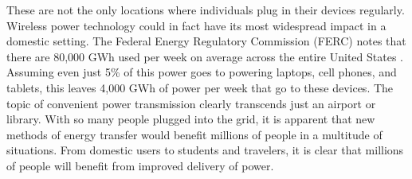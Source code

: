 These are not the only locations where individuals plug in their devices regularly. Wireless power technology could in fact have its most widespread impact in a domestic setting. The Federal Energy Regulatory Commission (FERC) notes that there are 80,000 GWh used per week on average across the entire United States \cite{Electric-Power-Markets}. Assuming even just 5\% of this power goes to powering laptops, cell phones, and tablets, this leaves 4,000 GWh of power per week that go to these devices. The topic of convenient power transmission clearly transcends just an airport or library. With so many people plugged into the grid, it is apparent that new methods of energy transfer would benefit millions of people in a multitude of situations. From domestic users to students and travelers, it is clear that millions of people will benefit from improved delivery of power.

